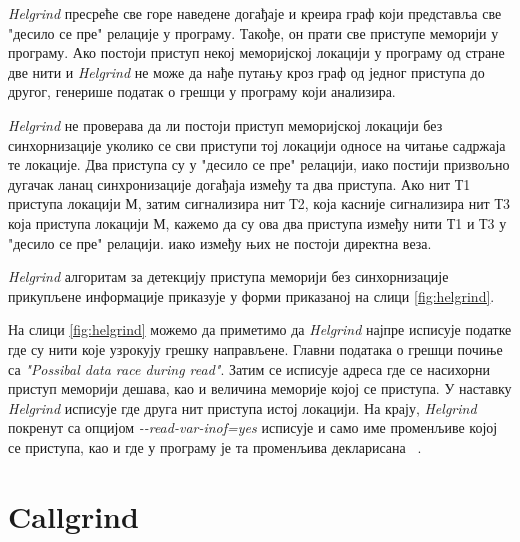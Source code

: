 \documentclass[12pt,oneside]{memoir}
\begin{document}
\indent \textit{Helgrind} пресреће све горе наведене догађаје и креира граф који представља све "десило се пре" релације у програму. Такође, он прати све приступе меморији у програму. Ако постоји приступ некој меморијској локацији у програму од стране две нити и \textit{Helgrind} не може да нађе путању кроз граф од једног приступа до другог, генерише податак о грешци у програму који анализира.

\indent \textit{Helgrind} не проверава да ли постоји приступ меморијској локацији без синхорнизације уколико се сви приступи тој локацији односе на читање садржаја те локације. Два приступа су у "десило се пре" релацији, иако постији призвољно дугачак ланац синхронизације догађаја између та два приступа. Ако нит Т1 приступа локацији М, затим сигнализира нит Т2, која касније сигнализира нит Т3 која приступа локацији М, кажемо да су ова два приступа између нити Т1 и Т3 у "десило се пре" релацији. иако између њих не постоји директна веза.

\indent \textit{Helgrind} алгоритам за детекцију приступа меморији без синхорнизације прикупљене информације приказује у форми приказаној на слици \ref{fig:helgrind}. 

\indent На слици \ref{fig:helgrind} можемо да приметимо да \textit{Helgrind} најпре исписује податке где су нити које узрокују грешку направљене. Главни података о грешци почиње са \textit{"Possibal data race during read"}. Затим се исписује адреса где се насихорни приступ меморији дешава, као и величина меморије којој се приступа. У наставку \textit{Helgrind} исписује где друга нит приступа истој локацији. На крају, \textit{Helgrind} покренут са опцијом \textit{-\--read-var-inof=yes} исписује и само име променљиве којој се приступа, као и где у програму је та променљива декларисана ~\cite{helgrindRef}.



\section{Callgrind}
\label{section_callgrind}
\end{document}
